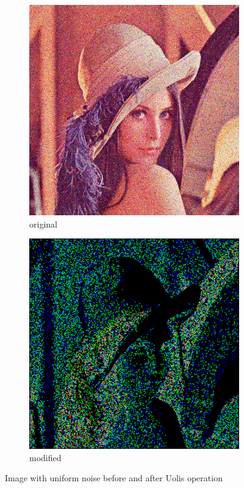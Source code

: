 \documentclass[12pt]{article}
\begin{document}
\begin{figure}[H]\centering
    \begin{subfigure}[t]{\subfiguresize}\centering
        \includegraphics[width=\textwidth]{lenac_uniform3.png}
        \caption{original}
    \end{subfigure}
    \hspace{.05\textwidth}
    \begin{subfigure}[t]{\subfiguresize}\centering
        \includegraphics[width=\textwidth]{lena_uolis_uniform.png}
        \caption{modified}
    \end{subfigure}
    \caption{Image with uniform noise before and after Uolis operation}
\end{figure}
\end{document}
